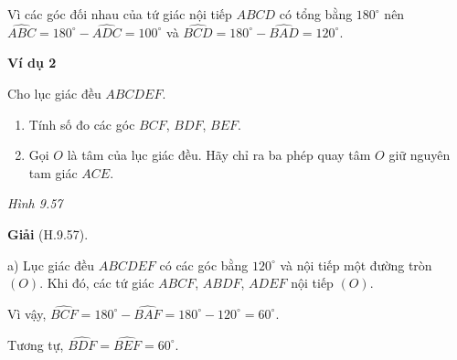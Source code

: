 \begin{exercises}
    Vì các góc đối nhau của tứ giác nội tiếp $ABCD$ có tổng bằng $180^\circ$ nên $\widehat{ABC}=180^\circ-\widehat{ADC}=100^\circ$ và $\widehat{BCD}=180^\circ-\widehat{BAD}=120^\circ$.

    \textbf{Ví dụ 2}

    Cho lục giác đều $ABCDEF$.
    \begin{enumerate}[label=\alph*)]
        \item Tính số đo các góc $BCF$, $BDF$, $BEF$.
        \item Gọi $O$ là tâm của lục giác đều. Hãy chỉ ra ba phép quay tâm $O$ giữ nguyên tam giác $ACE$.
    \end{enumerate}

    \begin{center}

        \textit{Hình 9.57}
    \end{center}

    \textbf{Giải} (H.9.57).

    a) Lục giác đều $ABCDEF$ có các góc bằng $120^\circ$ và nội tiếp một đường tròn $(O)$. Khi đó, các tứ giác $ABCF$, $ABDF$, $ADEF$ nội tiếp $(O)$.

    Vì vậy, $\widehat{BCF}=180^\circ-\widehat{BAF}=180^\circ-120^\circ=60^\circ$.

    Tương tự, $\widehat{BDF}=\widehat{BEF}=60^\circ$.


\end{exercises}

